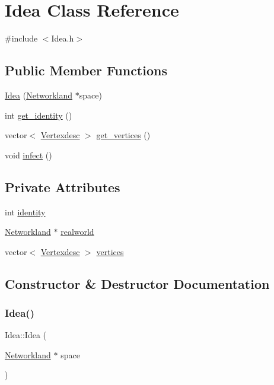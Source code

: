 \hypertarget{classIdea}{}\section{Idea Class Reference}
\label{classIdea}


{\ttfamily \#include $<$Idea.\+h$>$}

\subsection*{Public Member Functions}
\begin{DoxyCompactItemize}
\item 
\hyperlink{classIdea_a4b0fabec533a881d60dceb5504af7eac}{Idea} (\hyperlink{classNetworkland}{Networkland} $\ast$space)
\item 
int \hyperlink{classIdea_ab8b8f7c5025d4514493dd7a759ad1264}{get\+\_\+identity} ()
\item 
vector$<$ \hyperlink{Networkland_8h_af340ced64bd0b6914662d1b26be70b41}{Vertexdesc} $>$ \hyperlink{classIdea_a33d9819c499ec7326fb5b3827a396f5e}{get\+\_\+vertices} ()
\item 
void \hyperlink{classIdea_ad0053991270858766ffce283706831fd}{infect} ()
\end{DoxyCompactItemize}
\subsection*{Private Attributes}
\begin{DoxyCompactItemize}
\item 
int \hyperlink{classIdea_acb4d46a215bf7cab7ce73394ba178e61}{identity}
\item 
\hyperlink{classNetworkland}{Networkland} $\ast$ \hyperlink{classIdea_a0cfa1bec74431ad188ad974237244fe5}{realworld}
\item 
vector$<$ \hyperlink{Networkland_8h_af340ced64bd0b6914662d1b26be70b41}{Vertexdesc} $>$ \hyperlink{classIdea_a2d75d979d494040e3e8530d9aa0d860d}{vertices}
\end{DoxyCompactItemize}


\subsection{Constructor \& Destructor Documentation}
\mbox{\label{classIdea_a4b0fabec533a881d60dceb5504af7eac}} 
\subsubsection{\texorpdfstring{Idea()}{Idea()}}
{\footnotesize\ttfamily Idea\+::\+Idea (\begin{DoxyParamCaption}\item[{\hyperlink{classNetworkland}{Networkland} $\ast$}]{space }\end{DoxyParamCaption})}



